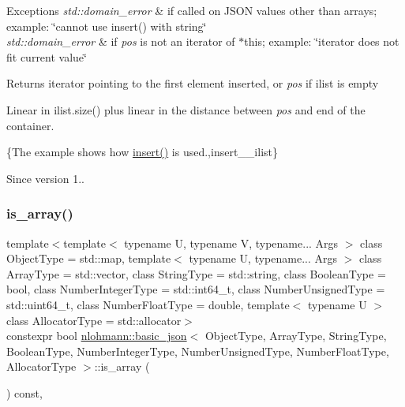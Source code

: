 \begin{DoxyExceptions}{Exceptions}
{\em std\+::domain\+\_\+error} & if called on J\+S\+ON values other than arrays; example\+: {\ttfamily \char`\"{}cannot use insert() with string\char`\"{}} \\
\hline
{\em std\+::domain\+\_\+error} & if {\itshape pos} is not an iterator of $\ast$this; example\+: {\ttfamily \char`\"{}iterator does not fit current value\char`\"{}}\\
\hline
\end{DoxyExceptions}
\begin{DoxyReturn}{Returns}
iterator pointing to the first element inserted, or {\itshape pos} if {\ttfamily ilist} is empty
\end{DoxyReturn}
Linear in {\ttfamily ilist.\+size()} plus linear in the distance between {\itshape pos} and end of the container.

\{The example shows how {\ttfamily \hyperlink{classnlohmann_1_1basic__json_a7f7bbb3a9efef2e2442f538a24c1c47b}{insert()}} is used.,insert\+\_\+\+\_\+ilist\}

\begin{DoxySince}{Since}
version 1.. 
\end{DoxySince}
\hypertarget{classnlohmann_1_1basic__json_a256a4cef002023acab3c9d75b569f54a}{}\label{classnlohmann_1_1basic__json_a256a4cef002023acab3c9d75b569f54a} 
\subsubsection{\texorpdfstring{is\+\_\+array()}{is\_array()}}
{\footnotesize\ttfamily template$<$template$<$ typename U, typename V, typename... Args $>$ class Object\+Type = std\+::map, template$<$ typename U, typename... Args $>$ class Array\+Type = std\+::vector, class String\+Type  = std\+::string, class Boolean\+Type  = bool, class Number\+Integer\+Type  = std\+::int64\+\_\+t, class Number\+Unsigned\+Type  = std\+::uint64\+\_\+t, class Number\+Float\+Type  = double, template$<$ typename U $>$ class Allocator\+Type = std\+::allocator$>$ \\
constexpr bool \hyperlink{classnlohmann_1_1basic__json}{nlohmann\+::basic\+\_\+json}$<$ Object\+Type, Array\+Type, String\+Type, Boolean\+Type, Number\+Integer\+Type, Number\+Unsigned\+Type, Number\+Float\+Type, Allocator\+Type $>$\+::is\+\_\+array (\begin{DoxyParamCaption}{ }\end{DoxyParamCaption}) const\hspace{0.3cm}{\ttfamily [inline]}, {\ttfamily [noexcept]}}




